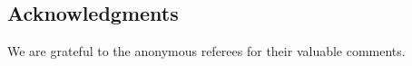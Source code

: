 \subsection{Acknowledgments}

We are grateful to the anonymous referees for their valuable comments.


































